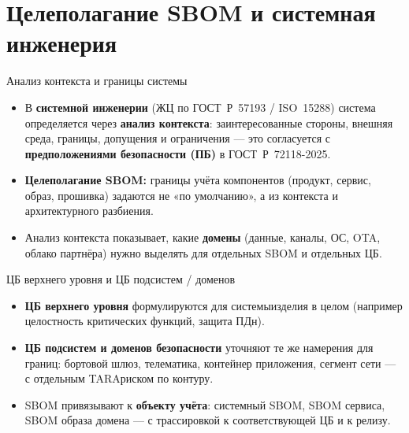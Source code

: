 \documentclass[aspectratio=169,10pt]{beamer}
\begin{document}
\section{Целеполагание SBOM и системная инженерия}

\begin{frame}{Анализ контекста и границы системы}
\footnotesize
\begin{itemize}
  \setlength{\itemsep}{0.18em}
  \item В \textbf{системной инженерии} (ЖЦ по ГОСТ~Р~57193 / ISO~15288) система определяется через \textbf{анализ контекста}: заинтересованные стороны, внешняя среда, границы, допущения и ограничения — это согласуется с \textbf{предположениями безопасности (ПБ)} в ГОСТ~Р~72118-2025.
  \item \textbf{Целеполагание SBOM:} границы учёта компонентов (продукт, сервис, образ, прошивка) задаются не «по умолчанию», а из контекста и архитектурного разбиения.
  \item Анализ контекста показывает, какие \textbf{домены} (данные, каналы, ОС, OTA, облако партнёра) нужно выделять для отдельных SBOM и отдельных ЦБ.
\end{itemize}
\end{frame}

\begin{frame}{ЦБ верхнего уровня и ЦБ подсистем / доменов}
\footnotesize
\begin{itemize}
  \setlength{\itemsep}{0.15em}
  \item \textbf{ЦБ верхнего уровня} формулируются для системы\/изделия в целом (например целостность критических функций, защита ПДн).
  \item \textbf{ЦБ подсистем и доменов безопасности} уточняют те же намерения для границ: бортовой шлюз, телематика, контейнер приложения, сегмент сети — с отдельным TARA\/риском по контуру.
  \item SBOM привязывают к \textbf{объекту учёта}: системный SBOM, SBOM сервиса, SBOM образа домена — с трассировкой к соответствующей ЦБ и к релизу.
\end{itemize}

\vspace{0.35em}
\centering
{}
\end{frame}
\end{document}
